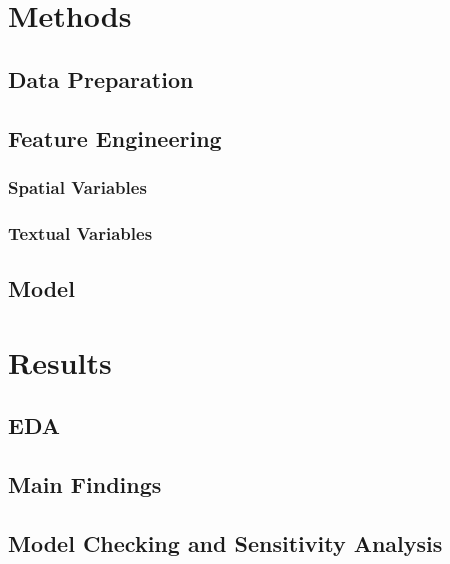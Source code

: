 \documentclass[10pt]{jmlr}%
\begin{document}
\section{Methods}
\label{sec:method}

\subsection{Data Preparation}
\label{sec:data}




\subsection{Feature Engineering}
\label{sec:feature}
\subsubsection{Spatial Variables}

\subsubsection{Textual Variables}



\subsection{Model}


\section{Results}
\label{sec:results}

\subsection{EDA}



\subsection{Main Findings}





\subsection{Model Checking and Sensitivity Analysis}
\end{document}
